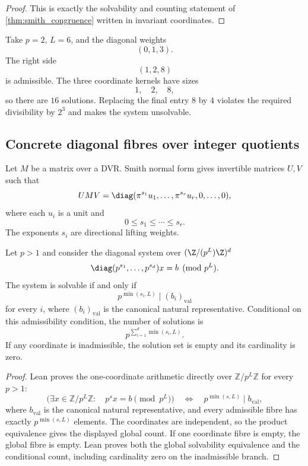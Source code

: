 \begin{proof}
This is exactly the solvability and counting statement of \cref{thm:smith_congruence} written in invariant coordinates.
\end{proof}

\begin{example}\label{ex:smith_three}
Take $p=2$, $L=6$, and the diagonal weights
\[
(0,1,3).
\]
The right side
\[
(1,2,8)
\]
is admissible.  The three coordinate kernels have sizes
\[
1,
\quad2,
\quad8,
\]
so there are $16$ solutions.  Replacing the final entry $8$ by $4$ violates the required divisibility by $2^3$ and makes the system unsolvable.
\end{example}

\subsection{Concrete diagonal fibres over integer quotients}

Let $M$ be a matrix over a DVR. Smith normal form gives invertible matrices $U,V$ such that
\[
UMV
=
\diag(\pi^{s_1}u_1,\ldots,\pi^{s_r}u_r,0,\ldots,0),
\]
where each $u_i$ is a unit and
\[
0\le s_1\le\cdots\le s_r.
\]
The exponents $s_i$ are directional lifting weights.

\begin{theorem}\label{thm:smith-solve}
Let $p>1$ and consider the diagonal system over
$(\Z/(p^L)\Z)^d$
\[
\diag(p^{s_1},\ldots,p^{s_d})x=b
\pmod{p^L}.
\]
The system is solvable if and only if
\[
p^{\min(s_i,L)}\mid (b_i)_{\mathrm{val}}
\]
for every $i$, where $(b_i)_{\mathrm{val}}$ is the canonical natural
representative. Conditional on this admissibility condition, the number of
solutions is
\[
\boxed{
p^{\sum_{i=1}^d\min(s_i,L)}.
}
\]
If any coordinate is inadmissible, the solution set is empty and its
cardinality is zero.
\end{theorem}

\begin{proof}
Lean proves the one-coordinate arithmetic directly over
$\mathbb Z/p^L\mathbb Z$ for every $p>1$:
\[
\bigl(\exists x\in\mathbb Z/p^L\mathbb Z:\quad p^s x=b\pmod{p^L}\bigr)
\quad\Longleftrightarrow\quad
p^{\min(s,L)}\mid b_{\mathrm{val}},
\]
where $b_{\mathrm{val}}$ is the canonical natural representative, and every
admissible fibre has exactly $p^{\min(s,L)}$ elements. The coordinates are
independent, so the product equivalence gives the displayed global count. If
one coordinate fibre is empty, the global fibre is empty. Lean proves both the
global solvability equivalence and the conditional count, including
cardinality zero on the inadmissible branch.
\end{proof}

